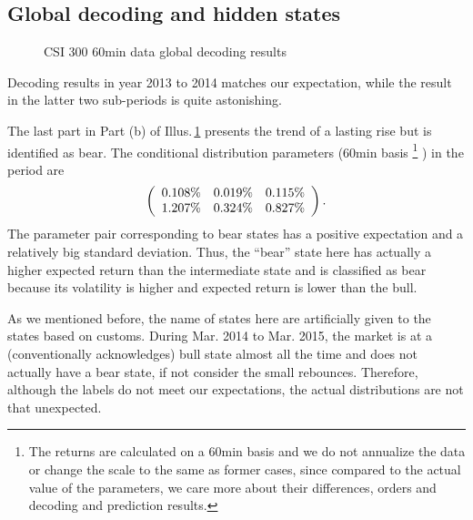 \subsection{Global decoding and hidden states}
\label{sec:positive:CSI60:states}
        \begin{figure}[!hbt]
        \begin{center}
        \end{center}
        \caption{CSI 300 60min data global decoding results}
        \label{fig:CSI60:states}
        \end{figure}
Decoding results in year 2013 to 2014 matches our expectation,
while the result in the latter two sub-periods is quite astonishing.

The last part in Part (b) of Illus.\,\ref{fig:CSI60:states} presents 
the trend of a lasting rise but is identified as bear.
The conditional distribution parameters (60min basis
\footnote{The returns are calculated on a 60min basis and 
we do not annualize the data or change the scale to the same as former cases,
since compared to the actual value of the parameters,
we care more about their differences, orders and decoding and prediction results.}
) in the period are
        \begin{equation}
        \left (
        \begin{array}{c c c}
        0.108\%  &  0.019\%  &  0.115\%  \\
        1.207\%  &  0.324\%  &  0.827\%  \\
        \end{array}
        \right ).
        \end{equation}
The parameter pair corresponding to bear states has a positive expectation
and a relatively big standard deviation.
Thus, the ``bear'' state here has actually a higher expected return than the
intermediate state and is classified as bear because its volatility is higher
and expected return is lower than the bull.

As we mentioned before, 
the name of states here are artificially given to the states based on customs.
During Mar. 2014 to Mar. 2015, 
the market is at a (conventionally acknowledges) bull state almost all the time
and does not actually have a bear state, if not consider the small rebounces.
Therefore, although the labels do not meet our expectations,
the actual distributions are not that unexpected.


